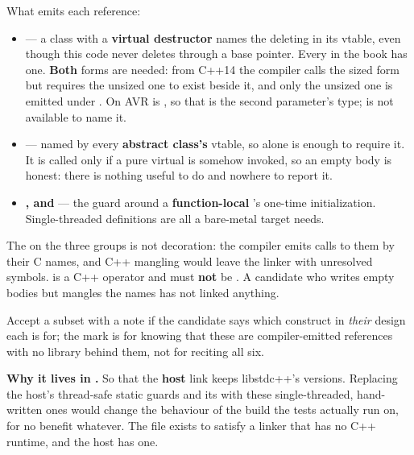 \noindent What emits each reference:
\begin{itemize}
  \item \textbf{} --- a class with a \textbf{virtual destructor} names the
    deleting  in its vtable, even though this code never deletes through a
    base pointer. Every  in the book has one. \textbf{Both} forms are needed: from
    C++14 the compiler calls the sized form but requires the unsized one to exist beside it, and only
    the unsized one is emitted under . On AVR  is
    , so that is the second parameter's type;  is not available
    to name it.
  \item \textbf{} --- named by every \textbf{abstract class's} vtable, so
     alone is enough to require it. It is called only if a pure virtual
    is somehow invoked, so an empty body is honest: there is nothing useful to do and nowhere to
    report it.
  \item \textbf{,  and } --- the guard around a
    \textbf{function-local }'s one-time initialization. Single-threaded definitions are
    all a bare-metal target needs.
\end{itemize}

The  on the three  groups is not decoration: the compiler emits calls
to them by their C names, and C++ mangling would leave the linker with unresolved symbols.
 is a C++ operator and must \textbf{not} be . A candidate who
writes empty bodies but mangles the names has not linked anything.

Accept a subset with a note if the candidate says which construct in \emph{their} design each is
for; the mark is for knowing that these are compiler-emitted references with no library behind
them, not for reciting all six.

\textbf{Why it lives in .} So that the \textbf{host} link keeps libstdc++'s versions.
Replacing the host's thread-safe static guards and its  with these
single-threaded, hand-written ones would change the behaviour of the build the tests actually run on,
for no benefit whatever. The file exists to satisfy a linker that has no C++ runtime, and the host
has one. 


